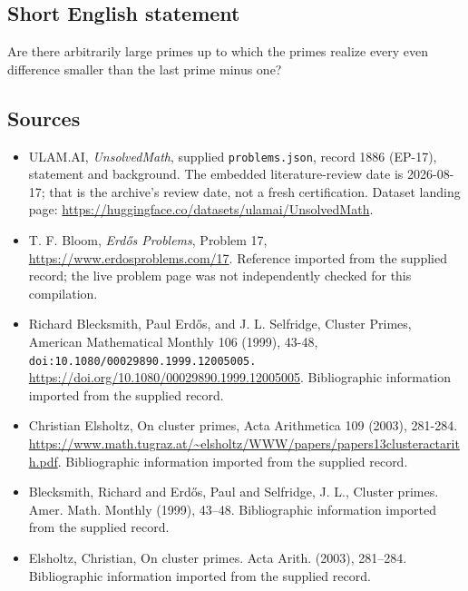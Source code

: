 \documentclass[11pt,a4paper]{article}
\begin{document}
\subsection{Short English statement}

Are there arbitrarily large primes up to which the primes realize every even difference smaller than the last prime minus one?

\subsection{Sources}

{\small

\begin{itemize}

\item[\hypertarget{source:1886:1}{S1}] ULAM.AI, \emph{UnsolvedMath}, supplied \texttt{problems.json}, record 1886 (EP-17), statement and background. The embedded literature-review date is 2026-08-17; that is the archive’s review date, not a fresh certification. Dataset landing page: \url{https://huggingface.co/datasets/ulamai/UnsolvedMath}.

\item[\hypertarget{source:1886:2}{S2}] T. F. Bloom, \emph{Erdős Problems}, Problem 17, \url{https://www.erdosproblems.com/17}. Reference imported from the supplied record; the live problem page was not independently checked for this compilation.

\item[\hypertarget{source:1886:3}{S3}] Richard Blecksmith, Paul Erdős, and J. L. Selfridge, Cluster Primes, American Mathematical Monthly 106 (1999), 43-48, \nolinkurl{doi:10.1080/00029890.1999.12005005.} \url{https://doi.org/10.1080/00029890.1999.12005005}. Bibliographic information imported from the supplied record.

\item[\hypertarget{source:1886:4}{S4}] Christian Elsholtz, On cluster primes, Acta Arithmetica 109 (2003), 281-284. \url{https://www.math.tugraz.at/~elsholtz/WWW/papers/papers13clusteractarith.pdf}. Bibliographic information imported from the supplied record.

\item[\hypertarget{source:1886:5}{S5}] Blecksmith, Richard and Erd\H{o}s, Paul and Selfridge, J. L., Cluster primes. Amer. Math. Monthly (1999), 43--48. Bibliographic information imported from the supplied record.

\item[\hypertarget{source:1886:6}{S6}] Elsholtz, Christian, On cluster primes. Acta Arith. (2003), 281--284. Bibliographic information imported from the supplied record.

\end{itemize}

}

\label{end:1886}
\end{document}
